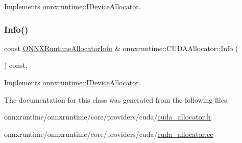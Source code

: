 Implements \mbox{\hyperlink{classonnxruntime_1_1IDeviceAllocator_aeabef1862123ae6d9478199db974e32a}{onnxruntime\+::\+I\+Device\+Allocator}}.

\mbox{\label{classonnxruntime_1_1CUDAAllocator_a347f391c14e4466bce42915feefa1f2f}} 
\subsubsection{\texorpdfstring{Info()}{Info()}}
{\footnotesize\ttfamily const \mbox{\hyperlink{structONNXRuntimeAllocatorInfo}{O\+N\+N\+X\+Runtime\+Allocator\+Info}} \& onnxruntime\+::\+C\+U\+D\+A\+Allocator\+::\+Info (\begin{DoxyParamCaption}{ }\end{DoxyParamCaption}) const\hspace{0.3cm}{\ttfamily [override]}, {\ttfamily [virtual]}}



Implements \mbox{\hyperlink{classonnxruntime_1_1IDeviceAllocator_a46b848cd863bcd50d1e63d48ad96c63c}{onnxruntime\+::\+I\+Device\+Allocator}}.



The documentation for this class was generated from the following files\+:\begin{DoxyCompactItemize}
\item 
onnxruntime/onnxruntime/core/providers/cuda/\mbox{\hyperlink{cuda__allocator_8h}{cuda\+\_\+allocator.\+h}}\item 
onnxruntime/onnxruntime/core/providers/cuda/\mbox{\hyperlink{cuda__allocator_8cc}{cuda\+\_\+allocator.\+cc}}\end{DoxyCompactItemize}
